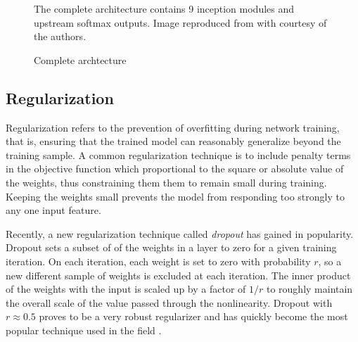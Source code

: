 \begin{figure}
\begin{center}
  \end{center}
  \caption{Complete \googlenet archtecture}{
  The complete \googlenet architecture contains 9 inception modules and upstream softmax outputs.
  Image reproduced from \cite{szegedy2014going} with courtesy of the authors.}
  \label{googlenet}
\end{figure}

\subsection{Regularization}
\label{regularization_section}

Regularization refers to the prevention of overfitting during network training, that is, ensuring that the trained model can reasonably generalize beyond the training sample.
A common regularization technique is to include penalty terms in the objective function which proportional to the square or absolute value of the weights, thus constraining them them to remain small during training.
Keeping the weights small prevents the model from responding too strongly to any one input feature.

Recently, a new regularization technique called \textit{dropout} \cite{hinton2014dropout} has gained in popularity.
Dropout sets a subset of of the weights in a layer to zero for a given training iteration.  On each iteration, each weight is set to zero with probability $r$, so a new different sample of weights is excluded at each iteration.
The inner product of the weights with the input is scaled up by a factor of $1/r$ to roughly maintain the overall scale of the value passed through the nonlinearity.
Dropout with $r\approx 0.5$ proves to be a very robust regularizer and has quickly become the most popular technique used in the field \cite{lecun2015deep}.


